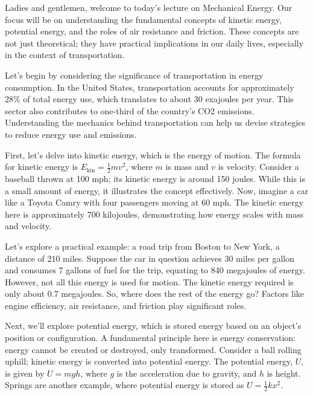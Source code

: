 \begin{tcolorbox}[size=title,opacityfill=0.05,breakable]
\noindent
Ladies and gentlemen, welcome to today's lecture on Mechanical Energy. Our focus will be on understanding the fundamental concepts of kinetic energy, potential energy, and the roles of air resistance and friction. These concepts are not just theoretical; they have practical implications in our daily lives, especially in the context of transportation.

Let's begin by considering the significance of transportation in energy consumption. In the United States, transportation accounts for approximately 28\% of total energy use, which translates to about 30 exajoules per year. This sector also contributes to one-third of the country's CO2 emissions. Understanding the mechanics behind transportation can help us devise strategies to reduce energy use and emissions.

First, let's delve into kinetic energy, which is the energy of motion. The formula for kinetic energy is \( E_{\text{kin}} = \frac{1}{2}mv^2 \), where \( m \) is mass and \( v \) is velocity. Consider a baseball thrown at 100 mph; its kinetic energy is around 150 joules. While this is a small amount of energy, it illustrates the concept effectively. Now, imagine a car like a Toyota Camry with four passengers moving at 60 mph. The kinetic energy here is approximately 700 kilojoules, demonstrating how energy scales with mass and velocity.

Let's explore a practical example: a road trip from Boston to New York, a distance of 210 miles. Suppose the car in question achieves 30 miles per gallon and consumes 7 gallons of fuel for the trip, equating to 840 megajoules of energy. However, not all this energy is used for motion. The kinetic energy required is only about 0.7 megajoules. So, where does the rest of the energy go? Factors like engine efficiency, air resistance, and friction play significant roles.

Next, we'll explore potential energy, which is stored energy based on an object's position or configuration. A fundamental principle here is energy conservation: energy cannot be created or destroyed, only transformed. Consider a ball rolling uphill; kinetic energy is converted into potential energy. The potential energy, \( U \), is given by \( U = mgh \), where \( g \) is the acceleration due to gravity, and \( h \) is height. Springs are another example, where potential energy is stored as \( U = \frac{1}{2}kx^2 \).


\end{tcolorbox}
